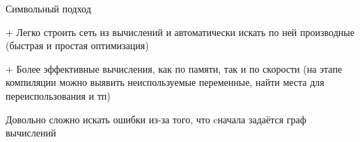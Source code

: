 \documentclass[notes,12pt, aspectratio=169]{beamer}
\newenvironment{wideitemize}{\itemize\addtolength{\itemsep}{10pt}}{\enditemize}
\begin{document}
\begin{frame}{Символьный подход}
\begin{wideitemize}
\item[+] Легко строить сеть из вычислений и автоматически искать по ней производные \alert{(быстрая и простая оптимизация)}

\item[+] Более эффективные вычисления, как по памяти, так и по скорости (на этапе компиляции можно выявить неиспользуемые переменные, найти места для переиспользования и тп) 

\item Довольно сложно искать ошибки из-за того, что cначала задаётся граф вычислений
\end{wideitemize}
\end{frame} 
\end{document}
